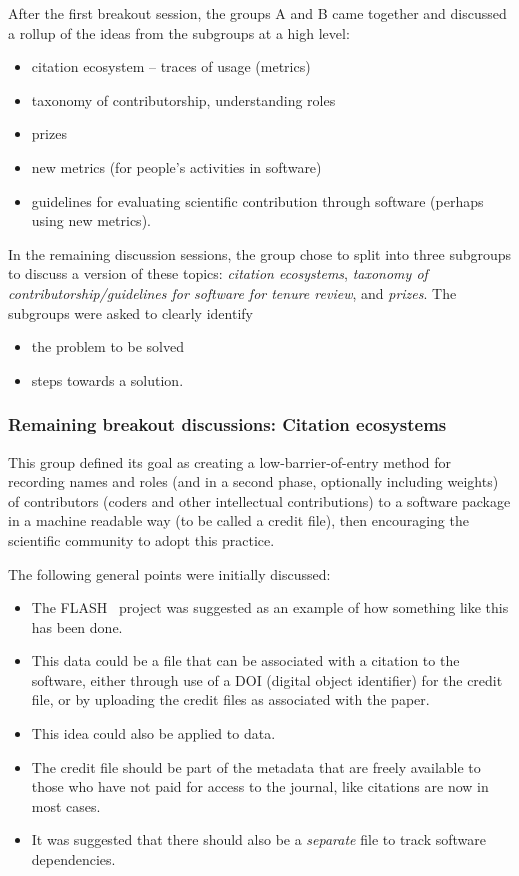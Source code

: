 \documentclass[11pt, oneside]{amsart}
\newcommand{\note}[1]{ {\textcolor{blueish}    { ***Note:      #1 }}}
\begin{document}
After the first breakout session, the groups A and B came together and discussed
a rollup of the ideas from the subgroups at a high level:
\begin{itemize}
\item citation ecosystem -- traces of usage (metrics)
\item taxonomy of contributorship, understanding roles
\item prizes
\item new metrics (for people's activities in software)
\item guidelines for evaluating scientific contribution through software (perhaps
using new metrics).
\end{itemize}

In the remaining discussion sessions, the group chose to split into three
subgroups to discuss a version of these topics: {\em citation ecosystems}, {\em
taxonomy of contributorship/guidelines for software for tenure review}, and {\em
prizes}. The subgroups were asked to clearly identify
\begin{itemize}
\item the problem to be solved
\item steps towards a solution.
\end{itemize}



\subsubsection{Remaining breakout discussions: Citation ecosystems}


This group defined its goal as creating a low-barrier-of-entry method for
recording names and roles (and in a second phase, optionally including weights)
of contributors (coders and other intellectual contributions) to a software
package in a machine readable way (to be called a credit file), then encouraging
the scientific community to adopt this practice.

The following general points were initially discussed:
\begin{itemize}
\item The FLASH~\cite{flash} project was suggested as an example of how something
like this has been done.
\item This data could be a file that can be associated with a citation to the
software, either through use of a DOI (digital object identifier) for the credit file, or by uploading the
credit files as associated with the paper.
\item This idea could also be applied to data.
\item The credit file should be part of the metadata that are freely
available to those who have not paid for access to the journal, like citations
are now in most cases.
\item It was suggested that there should also be a \emph{separate} file to track
software dependencies.%
\end{itemize}
\end{document}

